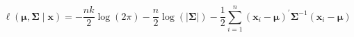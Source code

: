 \begin{equation}
    \ell
    \left(
    \boldsymbol{\mu},
    \boldsymbol{\Sigma}
    \mid
    \mathbf{x}
    \right)
    =
    -\frac{nk}{2}
    \log
    \left(
    2
    \pi
    \right)
    -\frac{n}{2}
    \log
    \left(
    \left|
    \boldsymbol{\Sigma}
    \right|
    \right)
    -
    \frac{1}{2}
    \sum_{i = 1}^{n}
    \left(
      \mathbf{x}_{i}
      -
      \boldsymbol{\mu}
    \right)^{\prime}
    \boldsymbol{\Sigma}^{-1}
    \left(
      \mathbf{x}_{i}
      -
      \boldsymbol{\mu}
    \right)
    \label{eq:multiNorm-mvn-loglikelihood}
\end{equation}